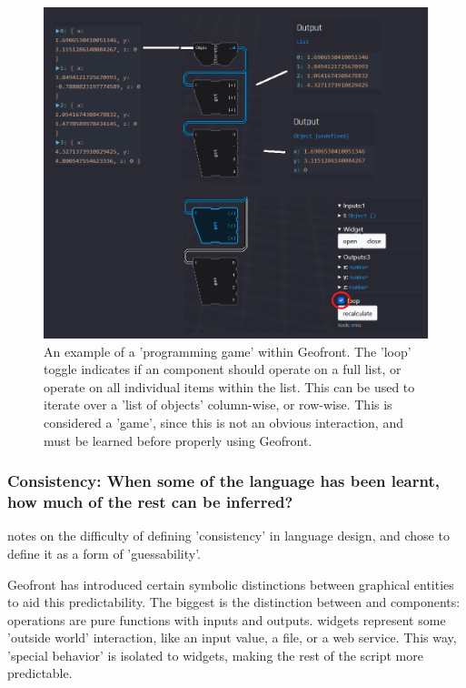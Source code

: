 \begin{figure}
  \graphicspath{{../../assets/images/6.2/}}
  \centering
  \includegraphics[width=\linewidth]{programming-game.PNG}
  \caption[]{An example of a 'programming game' within Geofront. The 'loop' toggle  indicates if an component should operate on a full list, or operate on all individual items within the list. 
  This can be used to iterate over a 'list of objects' column-wise, or row-wise. This is considered a 'game', since this is not an obvious interaction, and must be learned before properly using Geofront. }
  \label{fig:programming-game}
\end{figure}
 

\subsubsection*{Consistency: When some of the language has been learnt, how much of the rest can be inferred?}

\cite[]{green_usability_1996} notes on the difficulty of defining 'consistency' in language design, and chose to define it as a form of 'guessability'.

Geofront has introduced certain symbolic distinctions between graphical entities to aid this predictability. 
The biggest is the distinction between  and  components: 
operations are pure functions with inputs and outputs. 
widgets represent some 'outside world' interaction, like an input value, a file, or a web service. 
This way, 'special behavior' is isolated to widgets, making the rest of the script more predictable. 

